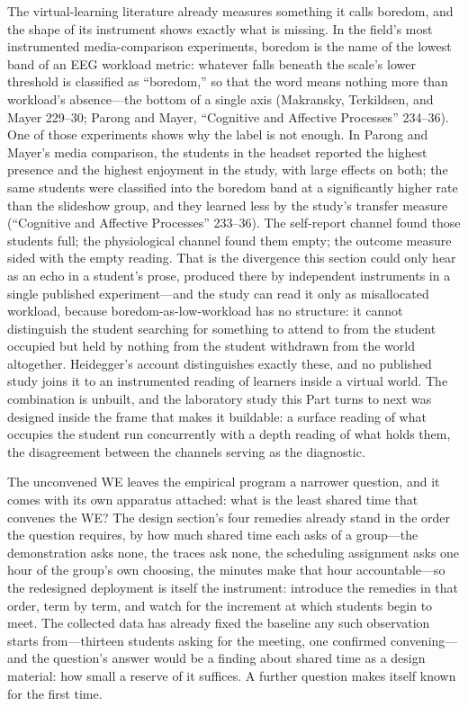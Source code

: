 The virtual-learning literature already measures something it calls
boredom, and the shape of its instrument shows exactly what is
missing. In the field's most instrumented media-comparison
experiments, boredom is the name of the lowest band of an EEG workload
metric: whatever falls beneath the scale's lower threshold is
classified as ``boredom,'' so that the word means nothing more than
workload's absence---the bottom of a single axis (Makransky,
Terkildsen, and Mayer 229--30; Parong and Mayer, ``Cognitive and
Affective Processes'' 234--36). One of those experiments shows why the
label is not enough. In Parong and Mayer's media comparison, the
students in the headset reported the highest presence and the highest
enjoyment in the study, with large effects on both; the same students
were classified into the boredom band at a significantly higher rate
than the slideshow group, and they learned less by the study's
transfer measure (``Cognitive and Affective Processes'' 233--36). The
self-report channel found those students full; the physiological
channel found them empty; the outcome measure sided with the empty
reading. That is the divergence this section could only hear as an
echo in a student's prose, produced there by independent instruments
in a single published experiment---and the study can read it only as
misallocated workload, because boredom-as-low-workload has no
structure: it cannot distinguish the student searching for something
to attend to from the student occupied but held by nothing from the
student withdrawn from the world altogether. Heidegger's account
distinguishes exactly these, and no published study joins it to an
instrumented reading of learners inside a virtual world. The
combination is unbuilt, and the laboratory study this Part turns to
next was designed inside the frame that makes it buildable: a surface
reading of what occupies the student run concurrently with a depth
reading of what holds them, the disagreement between the channels
serving as the diagnostic.

The unconvened WE leaves the empirical program a narrower question,
and it comes with its own apparatus attached: what is the least shared
time that convenes the WE? The design section's four remedies already
stand in the order the question requires, by how much shared time each
asks of a group---the demonstration asks none, the traces ask none,
the scheduling assignment asks one hour of the group's own choosing,
the minutes make that hour accountable---so the redesigned deployment
is itself the instrument: introduce the remedies in that order, term
by term, and watch for the increment at which students begin to meet.
The collected data has already fixed the baseline any such observation
starts from---thirteen students asking for the meeting, one confirmed
convening---and the question's answer would be a finding about
shared time as a design material: how small a reserve of it suffices.
A further question makes itself known for the first time.

